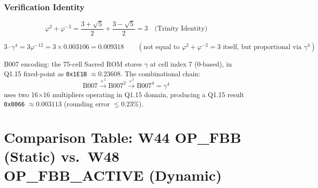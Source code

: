 \documentclass[12pt,a4paper]{report}
\theoremstyle{plain}
\theoremstyle{definition}
\theoremstyle{remark}
\newcommand{\gammaFour}{\gamma^{4}}
\begin{document}
\subsection{Verification Identity}

\begin{equation}
  \varphi^{2} + \varphi^{-2} = \frac{3 + \sqrt{5}}{2} + \frac{3 - \sqrt{5}}{2} = 3
  \quad\text{(Trinity Identity)}
\end{equation}

\begin{equation}
  3 \cdot \gammaFour = 3 \varphi^{-12} = 3 \times 0.003106 = 0.009318
  \qquad (\text{not equal to } \varphi^{2}+\varphi^{-2}=3 \text{ itself, but proportional via } \gammaFour)
\end{equation}

\noindent B007 encoding: the 75-cell Sacred ROM stores $\gamma$ at cell index 7 (0-based),
in Q1.15 fixed-point as \texttt{0x1E1B} $\approx 0.23608$.  The combinational chain:
\begin{equation}
  \text{B007} \xrightarrow{\times^{2}} \text{B007}^{2} \xrightarrow{\times^{2}} \text{B007}^{4}
  = \gammaFour
\end{equation}
uses two 16$\times$16 multipliers operating in Q1.15 domain, producing a Q1.15 result
\texttt{0x0066} $\approx 0.003113$ (rounding error $\leq 0.23\%$).

\chapter{Comparison Table: W44 OP\_FBB (Static) vs.\ W48 OP\_FBB\_ACTIVE (Dynamic)}
\label{app:gen_comparison}
\end{document}
